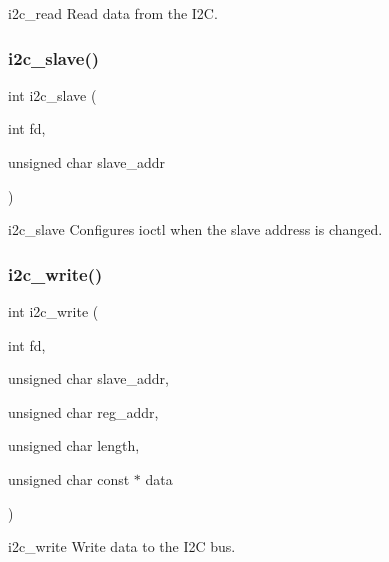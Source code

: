i2c\+\_\+read Read data from the I2C. \mbox{\label{i2c_8c_a1e3e7559d73b070ef09dbfe365c032f7}} 
\subsubsection{i2c\+\_\+slave()}
{\footnotesize\ttfamily int i2c\+\_\+slave (\begin{DoxyParamCaption}\item[{int}]{fd,  }\item[{unsigned char}]{slave\+\_\+addr }\end{DoxyParamCaption})}

i2c\+\_\+slave Configures \textquotesingle{}ioctl\textquotesingle{} when the slave address is changed. \mbox{\label{i2c_8c_acd741d59fd77f48f150cb53d70a520d9}} 
\subsubsection{i2c\+\_\+write()}
{\footnotesize\ttfamily int i2c\+\_\+write (\begin{DoxyParamCaption}\item[{int}]{fd,  }\item[{unsigned char}]{slave\+\_\+addr,  }\item[{unsigned char}]{reg\+\_\+addr,  }\item[{unsigned char}]{length,  }\item[{unsigned char const $\ast$}]{data }\end{DoxyParamCaption})}

i2c\+\_\+write Write data to the I2C bus. 